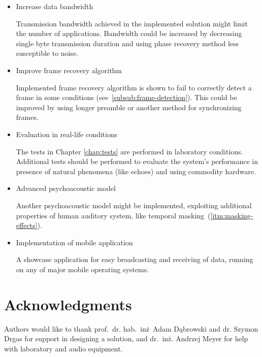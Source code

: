 \begin{itemize}
\item Increase data bandwidth

Transmission bandwidth achieved in the implemented solution might limit the number of applications.
Bandwidth could be increased by decreasing single byte transmission duration and using phase recovery method
less susceptible to noise.

\item Improve frame recovery algorithm

Implemented frame recovery algorithm is shown to fail to correctly detect a frame in some conditions (see~\ref{subsub:frame-detection}).
This could be improved by using longer preamble or another method for synchronizing frames.

\item Evaluation in real-life conditions

The tests in Chapter \ref{chap:tests} are performed in laboratory conditions. Additional tests should be
performed to evaluate the system's performance in presence of natural phenomena (like echoes) and using commodity hardware.

\item Advanced psychoacoustic model

Another psychoacoustic model might be implemented, exploiting additional properties of human auditory system, like
temporal masking~(\ref{itm:masking-effects}).

\item Implementation of mobile application

A showcase application for easy broadcasting and receiving of data, running on any of major mobile operating systems.
\end{itemize}

\section{Acknowledgments}

Authors would like to thank prof.~dr. hab.~inż~Adam Dąbrowski and dr. Szymon Drgas for support in designing a solution,
and dr.~inż. Andrzej Meyer for help with laboratory and audio equipment.
